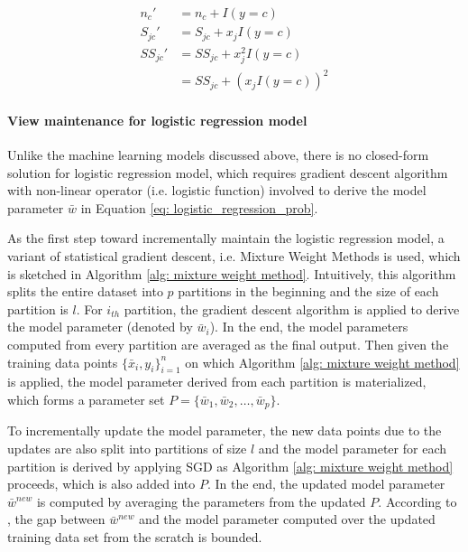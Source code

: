 \begin{equation}
    \begin{split}
        n_c' &= n_c + I(y=c)\\
        S_{jc}' &= S_{jc} + x_jI(y=c)\\
        SS_{jc}'&= SS_{jc} + x_j^2I(y=c)\\ &= SS_{jc} + (x_jI(y=c))^2
    \end{split}
\end{equation}

\paragraph{View maintenance for logistic regression model}
Unlike the machine learning models discussed above, there is no closed-form solution for logistic regression model, which requires gradient descent algorithm with non-linear operator (i.e. logistic function) involved to derive the model parameter $\bar{w}$ in Equation \ref{eq: logistic_regression_prob}. 

As the first step toward incrementally maintain the logistic regression model, a variant of statistical gradient descent, i.e. Mixture Weight Methods \cite{mcdonald2009efficient} is used, which is sketched in Algorithm \ref{alg: mixture weight method}. Intuitively, this algorithm splits the entire dataset into $p$ partitions in the beginning and the size of each partition is $l$. For $i_{th}$ partition, the gradient descent algorithm is applied to derive the model parameter (denoted by $\bar{w}_i$). In the end, the model parameters computed from every partition are averaged as the final output. Then given the training data points $\{\bar{x}_i, y_i\}_{i=1}^n$ on which Algorithm \ref{alg: mixture weight method} is applied, the model parameter derived from each partition is materialized, which forms a parameter set $P = \{\bar{w}_1, \bar{w}_2, \dots, \bar{w}_p\}$. 

To incrementally update the model parameter, the new data points due to the updates are also split into partitions of size $l$ and the model parameter for each partition is derived by applying SGD as Algorithm \ref{alg: mixture weight method} proceeds, which is also added into $P$. In the end, the updated model parameter $\bar{w}^{new}$ is computed by averaging the parameters from the updated $P$. According to \cite{mcdonald2009efficient}, the gap between $\bar{w}^{new}$ and the model parameter computed over the updated training data set from the scratch is bounded.


